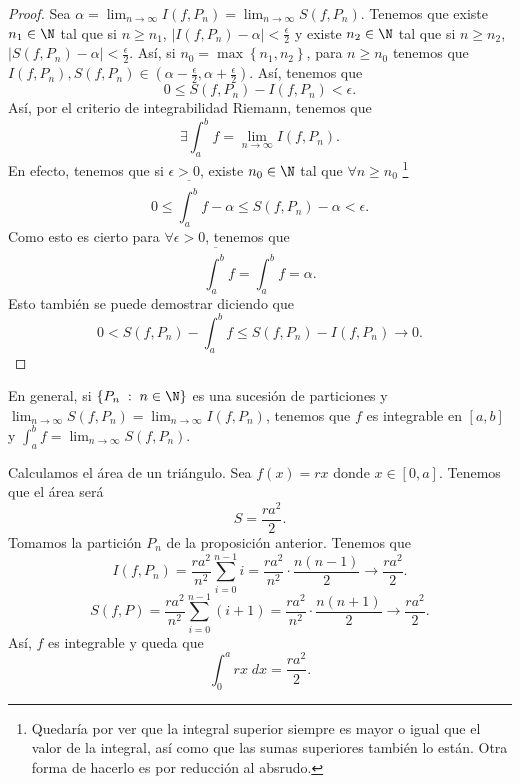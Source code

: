 \begin{proof}
Sea $\displaystyle \alpha = \lim_{n \to \infty}I\left(f,P_{n}\right) = \lim_{n \to \infty}S\left(f,P_{n}\right) $. Tenemos que existe $\displaystyle n_{1} \in \N $ tal que si $\displaystyle n \geq n_{1} $, $\displaystyle \left|I\left(f,P_{n}\right)-\alpha \right| < \frac{\epsilon }{2} $ y existe $\displaystyle n_{2} \in \N $ tal que si $\displaystyle n \geq n_{2} $, $\displaystyle \left|S\left(f,P_{n}\right)-\alpha \right|< \frac{\epsilon }{2} $. 
Así, si $\displaystyle n_{0} = \max \left\{ n_{1}, n_{2}\right\}  $, para $\displaystyle n \geq n_{0} $ tenemos que $\displaystyle I\left(f,P_{n}\right), S\left(f,P_{n}\right) \in \left(\alpha - \frac{\epsilon }{2}, \alpha + \frac{\epsilon }{2}\right) $. Así, tenemos que 
\[ 0 \leq S\left(f,P_{n}\right) - I\left(f,P_{n}\right) < \epsilon  .\]
Así, por el criterio de integrabilidad Riemann, tenemos que 
\[ \exists \int^{b}_{a} f = \lim_{n \to \infty}I\left(f,P_{n}\right) .\]
En efecto, tenemos que si $\displaystyle \epsilon > 0 $, existe $\displaystyle n_{0} \in \N $ tal que $\displaystyle \forall n \geq n_{0} $ \footnote{Quedaría por ver que la integral superior siempre es mayor o igual que el valor de la integral, así como que las sumas superiores también lo están. Otra forma de hacerlo es por reducción al absrudo.} 
\[ 0 \leq \overline{\int^{b}_{a}} f - \alpha \leq S\left(f,P_{n}\right)-\alpha < \epsilon .\]
Como esto es cierto para $\displaystyle \forall \epsilon > 0 $, tenemos que 
\[ \overline{\int^{b}_{a}}f = \int^{b}_{a} f=\alpha .\]
Esto también se puede demostrar diciendo que 
\[ 0 < S\left(f,P_{n}\right) - \int^{b}_{a} f \leq S\left(f,P_{n}\right)-I\left(f,P_{n}\right) \to 0 .\]
\end{proof}
\begin{observation}
	\normalfont En general, si $\displaystyle \left\{ P_{n} \; : \; n \in \N\right\}  $ es una sucesión de particiones y $\displaystyle \lim_{n \to \infty}S\left(f,P_{n}\right)= \lim_{n \to \infty}I\left(f,P_{n}\right) $, tenemos que $\displaystyle f $ es integrable en $\displaystyle \left[a,b\right]  $ y $\displaystyle \int^{b}_{a} f = \lim_{n \to \infty}S\left(f,P_{n}\right) $.
\end{observation}
\begin{eg}
	\normalfont Calculamos el área de un triángulo. Sea $\displaystyle f\left(x\right) = rx $ donde $\displaystyle x \in [0,a] $. Tenemos que el área será
	\[ S = \frac{ra^{2}}{2} .\]
Tomamos la partición $\displaystyle P_{n} $ de la proposición anterior. Tenemos que 
\[ I\left(f,P_{n}\right) = \frac{ra^{2}}{n^{2}}\sum^{n-1}_{i = 0}i = \frac{ra^{2}}{n^{2}} \cdot \frac{n\left(n-1\right)}{2} \to \frac{ra^{2}}{2}.\]
\[S\left(f,P\right) = \frac{ra^{2}}{n^{2}}\sum^{n-1}_{i = 0}\left(i + 1\right) = \frac{ra^{2}}{n^{2}} \cdot \frac{n\left(n+1\right)}{2} \to \frac{ra^{2}}{2} .\]
Así, $f $ es integrable y queda que 
\[\int^{a}_{0} rx \; dx = \frac{ra^{2}}{2} .\]
\end{eg}
